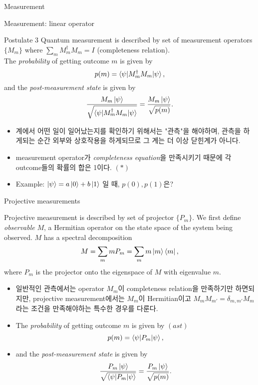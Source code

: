 \documentclass[9pt]{beamer}
\begin{document}
    \begin{section}{Measurement}
        \begin{frame}{Measurement: linear operator}
            \begin{block}{Postulate 3}
                Quantum measurement is described by set of measurement operators $\{M_m\}$ where $\sum_m M_m^\dagger M_m = I$ (completeness relation). 
                \\ The \textit{probability} of getting outcome $m$ is given by
                $$p(m) = \braket{\psi | M_m^\dagger M_m | \psi}, $$
                and the \textit{post-measurement state} is given by
                $$\frac{M_m\ket\psi}{ \sqrt{\braket{\psi | M_m^\dagger M_m | \psi}}} = \frac{M_m\ket\psi}{ \sqrt{p(m)}}.$$
            \end{block}
            \begin{itemize}
                \item 계에서 어떤 일이 일어났는지를 확인하기 위해서는 "관측"을 해야하며, 관측을 하게되는 순간 외부와 상호작용을 하게되므로 그 계는 더 이상 닫힌계가 아니다.
                \item measurement operator가 \textit{completeness equation}을 만족시키기 때문에 각 outcome들의 확률의 합은 1이다. $(\ast)$
                \item Example: $\ket \psi = a \ket 0 + b \ket 1$ 일 때, $p(0), p(1)$은?
                \vspace{1cm}
            \end{itemize}
        \end{frame}

        \begin{frame}{Projective measurements}
            \begin{definition}
                Projective measurement is described by set of projector $\{P_m\}$. We first define \textit{observable} $M$, a Hermitian operator on the state space of the system being observed.
                $M$ has a spectral decomposition
                $$ M = \sum_m m P_m = \sum_m m \ket m \bra m, $$
                where $P_m$ is the projector onto the eigenspace of $M$ with eigenvalue $m$.
            \end{definition}
            \begin{itemize}
                \item 일반적인 관측에서는 operator $M_m$이 completeness relation을 만족하기만 하면되지만, projective measurement에서는 $M_m$이 Hermitian이고 $M_m M_{m'} = \delta_{m,m'} M_m$라는 조건을 만족해야하는 특수한 경우를 다룬다.
                \item The \textit{probability} of getting outcome $m$ is given by $(ast)$
                $$p(m) = \braket{\psi | P_m | \psi}, $$
                \item and the \textit{post-measurement state} is given by
                $$\frac{P_m\ket\psi}{ \sqrt{\braket{\psi | P_m | \psi}}} = \frac{P_m\ket\psi}{ \sqrt{p(m)}}.$$
            \end{itemize}
        \end{frame}


\end{section}
\end{document}
